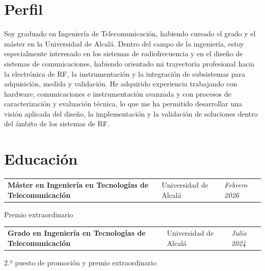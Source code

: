 \section{Perfil}
\begin{onecolentry}
	Soy graduado en Ingeniería de Telecomunicación, habiendo cursado el grado y el máster en la Universidad de Alcalá. Dentro del campo de la ingeniería, estoy especialmente interesado en los sistemas de radiofrecuencia y en el diseño de sistemas de comunicaciones, habiendo orientado mi trayectoria profesional hacia la electrónica de RF, la instrumentación y la integración de subsistemas para adquisición, medida y validación. He adquirido experiencia trabajando con hardware, comunicaciones e instrumentación avanzada y con procesos de caracterización y evaluación técnica, lo que me ha permitido desarrollar una visión aplicada del diseño, la implementación y la validación de soluciones dentro del ámbito de los sistemas de RF.
\end{onecolentry}

\vspace{-5pt}

\section{Educación}

\begin{onecolentry}
	\begin{tabularx}{\textwidth}{@{}>{\raggedright\arraybackslash}X>{\raggedright\arraybackslash}p{3.6cm}>{\raggedleft\arraybackslash}p{2.4cm}@{}}
		\textbf{Máster en Ingeniería en Tecnologías de Telecomunicación} & Universidad de Alcalá & \textit{Febrero 2026}
	\end{tabularx}
	
	\vspace{0.05 cm}
	\hspace{0.2cm}Premio extraordinario
\end{onecolentry}

\vspace{0.2 cm}

\begin{onecolentry}
	\begin{tabularx}{\textwidth}{@{}>{\raggedright\arraybackslash}X>{\raggedright\arraybackslash}p{3.6cm}>{\raggedleft\arraybackslash}p{2.4cm}@{}}
		\textbf{Grado en Ingeniería en Tecnologías de Telecomunicación} & Universidad de Alcalá & \textit{Julio 2024}
	\end{tabularx}
	
	\vspace{0.05 cm}
	\hspace{0.2cm}2.º puesto de promoción y premio extraordinario
\end{onecolentry}

